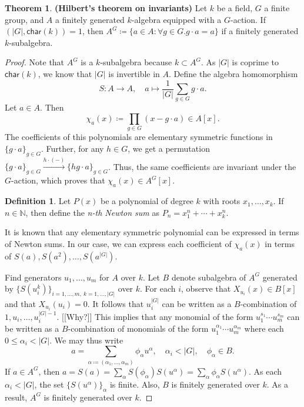 \documentclass[10pt,letterpaper,cm]{nupset}
\theoremstyle{definition}
\newtheorem*{definition}{Definition}
\newtheorem{theorem}{Theorem}
\newcommand{\N}{\mathbb N}
\newcommand{\1}{\mathbf{1}}
\newcommand{\0}{\vec 0}
\newcommand{\Char}{\mathsf{char}}
\begin{document}
\begin{theorem}{\textbf{(Hilbert's theorem on invariants)}}
Let $k$ be a field, $G$ a finite group, and $A$ a finitely generated $k$-algebra equipped with a $G$-action. If $(|G|, \Char(k))=1$, then $A^G\coloneqq  \{ a \in A: \forall g \in G.g\cdot a =a\}$ if a finitely generated $k$-subalgebra. 
\end{theorem}
\begin{proof}
Note that $A^G$ is a $k$-subalgebra because $k\subset A^G$. As $|G|$ is coprime to $\Char(k)$, we know that $|G|$ is invertible in $A$. Define the algebra homomorphism $$S: A \to A, \quad a \mapsto \frac{1}{|G|}\sum_{g\in G}g\cdot a   .$$ Let $a\in A$. Then $$\chi_a(x)\coloneqq  \prod_{g\in G}(x-g\cdot a)\in A[x].$$ The coefficients of this polynomials are elementary symmetric functions in $\{g\cdot a\}_{g\in G}$. Further, for any $h\in G$, we get a permutation $\{g\cdot a\}_{g\in G} \overset{h\cdot (-)}{\longrightarrow} \{h g\cdot a\}_{g\in G}$. Thus, the same coefficients are invariant under the $G$-action, which proves that $\chi_a(x) \in A^G[x]$. 
\begin{definition}
Let $P(x)$ be a polynomial of degree $k$ with roots $x_1, \ldots, x_k$. If $n\in \N$, then define the \textit{n-th Newton sum} as $P_n = x_1^n + \cdots + x_k^n$.
\end{definition}
It is known that any elementary symmetric polynomial can be expressed in terms of Newton sums. In our case, we can express each coefficient of $\chi_a(x)$ in terms of $S(a), S(a^2) , \ldots, S(a^{|G|})$.

Find generators $u_1, \ldots, u_m$ for $A$ over $k$. Let $B$ denote subalgebra of $A^G$ generated by $\{S(u_i^k)\}_{i=1, \ldots, m,\ k=1, \ldots, |G|}$ over $k$. For each $i$, observe that $X_{u_i}(x) \in B[x]$ and that $X_{u_i}(u_i) =0$. It follows that $u_i^{|G|}$ can be written as a $B$-combination of $1, u_i, \ldots, u_i^{|G|-1}$. {[[Why?]]} This implies that any monomial of the form $u_1^{s_1}\cdots u_m^{s_m}$ can be written as a $B$-combination of monomials of the form $u_1^{\alpha_1}\cdots u_m^{\alpha_m}$ where each $0\leq \alpha_i <|G|$. We may thus write $$a= \sum_{\alpha\coloneqq  (\alpha_1, \ldots, \alpha_m)}\phi_{\alpha}u^{\alpha}, \quad \alpha_i < |G|, \quad \phi_{\alpha} \in B.   $$ If $a\in A^G$, then $a=S(a) = \sum_{\alpha}S(\phi_{\alpha})S(u^{\alpha}) = \sum_{\alpha} \phi_{\alpha}S(u^{\alpha})$. As each $\alpha_i<|G|$,  the set $\{S(u^{\alpha})\}_{\alpha}$ is finite. Also, $B$ is finitely generated over $k$. As a result, $A^G$ is finitely generated over $k$. 
\end{proof}
\end{document}
